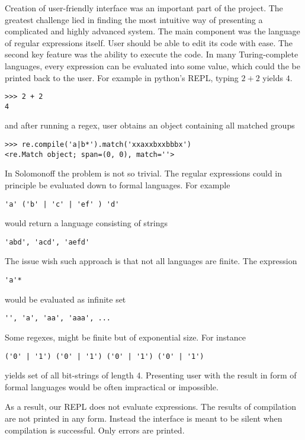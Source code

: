 
Creation of user-friendly interface was an important part of the project.
The greatest challenge lied in finding the most intuitive way of presenting a complicated and highly advanced system. The main component was the language of regular expressions itself. User should be able to edit its code with ease. The second key feature was the ability to execute the code. 
In many Turing-complete languages, every expression can be evaluated into some value, which could the be printed back to the user. For example in python's REPL, typing $2+2$ yields $4$.
\begin{lstlisting}
>>> 2 + 2
4
\end{lstlisting}
and after running a regex, user obtains an object containing all matched groups
\begin{lstlisting}
>>> re.compile('a|b*').match('xxaxxbxxbbbx')
<re.Match object; span=(0, 0), match=''>
\end{lstlisting}
In Solomonoff the problem is not so trivial. The regular expressions could in principle be evaluated down to formal languages. For example 
\begin{lstlisting}
'a' ('b' | 'c' | 'ef' ) 'd'
\end{lstlisting}
would return a language consisting of strings
\begin{lstlisting}
'abd', 'acd', 'aefd'
\end{lstlisting}
The issue wish such approach is that not all languages are finite. The expression
\begin{lstlisting}
'a'*
\end{lstlisting}
would be evaluated as infinite set
\begin{lstlisting}
'', 'a', 'aa', 'aaa', ...
\end{lstlisting}
Some regexes, might be finite but of exponential size. For instance
\begin{lstlisting}
('0' | '1') ('0' | '1') ('0' | '1') ('0' | '1')
\end{lstlisting}
yields set of all bit-strings of length 4. Presenting user with the result in form of formal languages would be often impractical or impossible. 

As a result, our REPL does not evaluate expressions. The results of compilation are not printed in any form. Instead the interface is meant to be silent when compilation is successful. Only errors are printed. 

